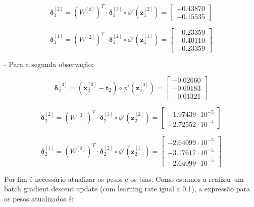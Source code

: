 \documentclass[a4paper,12pt]{article} %
\begin{document}
\begin{enumerate}
\begin{equation*}
    \bm{\delta}^{[2]}_1 = (W^{[3]})^T \cdot \bm{\delta}^{[3]}_1 \circ \phi'(\textbf{z}^{[2]}_1) = \begin{bmatrix} -0.43870\\ -0.15535 \end{bmatrix}
\end{equation*}

\begin{equation*}
    \bm{\delta}^{[1]}_1 = (W^{[2]})^T \cdot \bm{\delta}^{[2]}_1 \circ \phi'(\textbf{z}^{[1]}_1) = \begin{bmatrix} -0.23359 \\ -0.40110 \\ -0.23359 \end{bmatrix}
\end{equation*}

- Para a segunda observação:

\begin{equation*}
    \bm{\delta}^{[3]}_2 = (\textbf{x}^{[3]}_2 - \textbf{t}_2) \circ \phi'(\textbf{z}^{[3]}_2) = \begin{bmatrix} -0.02660 \\ -0.00183 \\ -0.01321 \end{bmatrix}
\end{equation*}

\begin{equation*}
    \bm{\delta}^{[2]}_2 = (W^{[3]})^T \cdot \bm{\delta}^{[3]}_2 \circ \phi'(\textbf{z}^{[2]}_2) = \begin{bmatrix} -1.97439\cdot 10^{-5} \\ -2.72552\cdot 10^{-4} \end{bmatrix}
\end{equation*}

\begin{equation*}
    \bm{\delta}^{[1]}_2 = (W^{[2]})^T \cdot \bm{\delta}^{[2]}_2 \circ \phi'(\textbf{z}^{[1]}_2) = \begin{bmatrix} -2.64099\cdot 10^{-5} \\ -3.17617\cdot 10^{-5} \\ -2.64099\cdot 10^{-5} \end{bmatrix}
\end{equation*}

Por fim é necessário atualizar os pesos e os bias. Como estamos a realizar um batch gradient descent update (com learning rate igual a 0.1), a expressão para os pesos atualizados é:


\end{enumerate}
\end{document}
